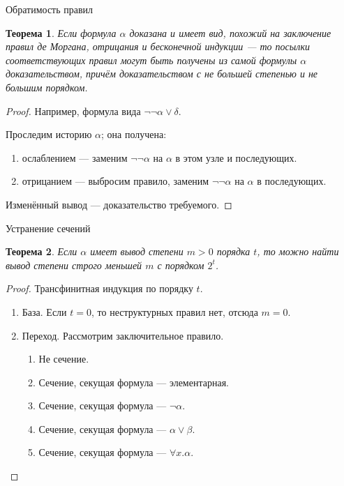 \documentclass[aspectratio=169]{beamer}
\newtheorem{thm}{Теорема}[section]
\begin{document}
\begin{frame}{Обратимость правил}
\begin{thm}
Если формула $\alpha$ доказана и имеет вид, похожий на заключение правил де Моргана, 
отрицания и бесконечной индукции --- то посылки соответствующих правил могут быть получены из самой 
формулы $\alpha$ доказательством, причём доказательством с не большей степенью и не большим порядком.
\end{thm}
\begin{proof}
Например, формула вида $\neg\neg \alpha\vee\delta$. \pause

Проследим историю $\alpha$; она получена:
\begin{enumerate}
\item ослаблением --- заменим $\neg\neg\alpha$ на $\alpha$ в этом узле и последующих.
\item отрицанием --- выбросим правило, заменим $\neg\neg\alpha$ на $\alpha$ в последующих.
\end{enumerate}
Изменённый вывод --- доказательство требуемого.
\end{proof}
\end{frame}

\begin{frame}{Устранение сечений}
\begin{thm}Если $\alpha$ имеет вывод степени $m>0$ порядка $t$, то
можно найти вывод степени строго меньшей $m$ с порядком $2^t$.
\end{thm}

\begin{proof}Трансфинитная индукция по порядку $t$.\begin{enumerate}
\item База. Если $t=0$, то неструктурных правил нет, отсюда $m = 0$.
\item Переход. Рассмотрим заключительное правило.
\begin{enumerate}
\item Не сечение.
\item Сечение, секущая формула --- элементарная.
\item Сечение, секущая формула --- $\neg\alpha$.
\item Сечение, секущая формула --- $\alpha\vee\beta$.
\item Сечение, секущая формула --- $\forall x.\alpha$.
\end{enumerate}
\end{enumerate}
\end{proof}
\end{frame}
\end{document}
